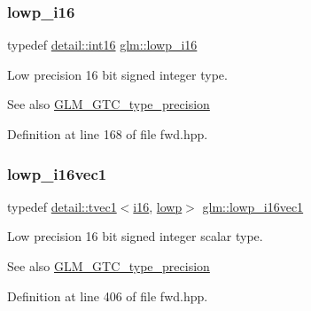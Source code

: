 \subsubsection{\texorpdfstring{lowp\+\_\+i16}{lowp\_i16}}
{\footnotesize\ttfamily typedef \hyperlink{namespaceglm_1_1detail_a375938874ca4f0a0982ec6373b56117b}{detail\+::int16} \hyperlink{group__gtc__type__precision_gaf7bbfd31bcec25a416ea94d09efb5451}{glm\+::lowp\+\_\+i16}}

Low precision 16 bit signed integer type. \begin{DoxySeeAlso}{See also}
\hyperlink{group__gtc__type__precision}{G\+L\+M\+\_\+\+G\+T\+C\+\_\+type\+\_\+precision} 
\end{DoxySeeAlso}


Definition at line 168 of file fwd.\+hpp.

\mbox{\label{group__gtc__type__precision_ga6f1e42c07424a2f14faf731c74ba2153}} 
\subsubsection{\texorpdfstring{lowp\+\_\+i16vec1}{lowp\_i16vec1}}
{\footnotesize\ttfamily typedef \hyperlink{structglm_1_1detail_1_1tvec1}{detail\+::tvec1}$<$\hyperlink{group__gtc__type__precision_ga35e5542ca05b29cc256fdafb8503d1fd}{i16}, \hyperlink{namespaceglm_a0f04f086094c747d227af4425893f545ae161af3fc695e696ce3bf69f7332bc2d}{lowp}$>$ \hyperlink{group__gtc__type__precision_ga6f1e42c07424a2f14faf731c74ba2153}{glm\+::lowp\+\_\+i16vec1}}

Low precision 16 bit signed integer scalar type. \begin{DoxySeeAlso}{See also}
\hyperlink{group__gtc__type__precision}{G\+L\+M\+\_\+\+G\+T\+C\+\_\+type\+\_\+precision} 
\end{DoxySeeAlso}


Definition at line 406 of file fwd.\+hpp.

\mbox{\label{group__gtc__type__precision_ga47c5d4c919266799ecc76d832356feff}} 
